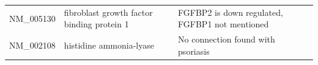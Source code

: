 \documentclass[10pt,a4paper]{report}
\begin{document}
\begin{table}[]
\begin{tabular}{l|p{4.5cm} p{8.5cm}}
			NM\_005130         & fibroblast growth factor binding protein 1                                                                              & FGFBP2 is down regulated, FGFBP1 not mentioned \cite{suarez2012expanding}                                                                                                                                                                                               \\
			NM\_002108         & histidine ammonia-lyase                                                                                                 & No connection found with psoriasis                                                                                                                                                                                                                                          \\ \hline                                                                                                                                                                                                                                        
		\end{tabular}
	\end{table}
	
\end{document}
